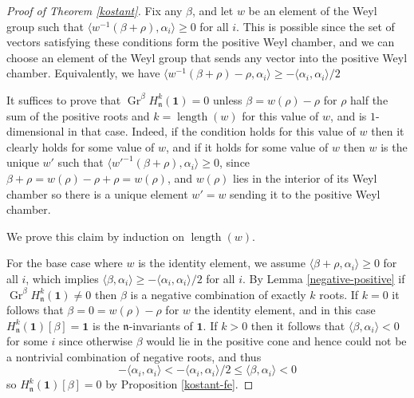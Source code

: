 \documentclass[11pt,letterpaper]{article}
\theoremstyle{definition}
\theoremstyle{remark}
\numberwithin{equation}{section}
\theoremstyle{dotless}
\newcommand{\Gr}{\operatorname{Gr}}
\newcommand{\LieH}{H}
\begin{document}
\begin{proof}[Proof of Theorem \ref{kostant}] 


Fix any $\beta$, and let $w$ be an element of the  Weyl group such that $\langle w^{-1}( \beta+\rho) , \alpha_i \rangle  \geq  0$ for all $i$. This is possible since the set of vectors satisfying these conditions form the positive Weyl chamber, and we can choose an element of the Weyl group that sends any vector into the positive Weyl chamber. Equivalently, we have  $\langle w^{-1}( \beta+\rho) - \rho  , \alpha_i \rangle  \geq  - \langle \alpha_i , \alpha_i \rangle /2 $ 

It suffices to prove that  $ \Gr^\beta \LieH^{k}_{\mathfrak n} ( \mathbf 1)=0 $ unless $\beta = w(\rho)-\rho$ for $\rho$ half the sum of the positive roots and $k= \operatorname{length}(w)$ for this value of $w$, and is $1$-dimensional in that case. Indeed, if the condition holds for this value of $w$ then it clearly holds for some value of $w$, and if it holds for some value of $w$ then $w$ is the unique $w'$ such that $\langle w'^{-1}( \beta+\rho) , \alpha_i \rangle  \geq  0$, since $\beta+\rho = w(\rho)-\rho+\rho=w(\rho)$, and $w(\rho)$ lies in the interior of its Weyl chamber so there is a unique element $w'=w$ sending it to the positive Weyl chamber.

We prove this claim by induction on $\operatorname{length}(w)$.

For the base case where $w$ is the identity element, we assume $\langle \beta + \rho , \alpha_i \rangle \geq 0$ for all $i$, which implies $\langle \beta,\alpha_i\rangle \geq - \langle \alpha_i,\alpha_i \rangle /2$ for all $i$.  By Lemma \ref{negative-positive} if $\Gr^\beta \LieH^{k}_{\mathfrak n} ( \mathbf 1) \neq0$ then $\beta$ is a negative combination of exactly $k$ roots. If $k=0$ it follows that $\beta=0 = w(\rho)-\rho$ for $w$ the identity element, and in this case $\LieH^{k}_{\mathfrak n} ( \mathbf 1) [\beta]=\mathbf 1$ is the $\mathfrak n$-invariants of $\mathbf 1$. If $k>0$ then it follows that $\langle \beta, \alpha_i \rangle<0$ for some $i$ since otherwise $\beta$ would lie in the positive cone and hence could not be a nontrivial combination of negative roots, and thus $$- \langle \alpha_i,\alpha_i \rangle < - \langle \alpha_i,\alpha_i \rangle /2 \leq \langle \beta, \alpha_i \rangle<0$$ so $\LieH^{k}_{\mathfrak n} ( \mathbf 1) [\beta]=0 $ by Proposition \ref{kostant-fe}.


\end{proof}
\end{document}
